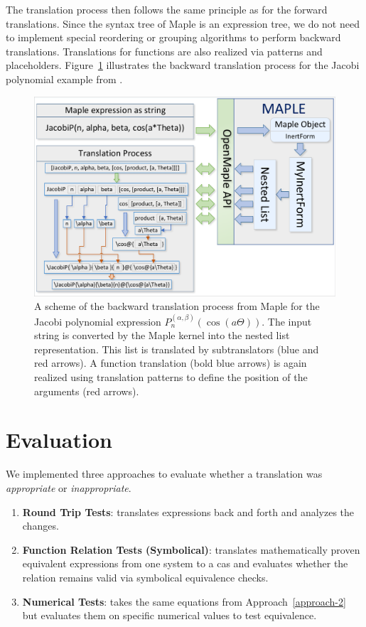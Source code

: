 \documentclass[a4paper,11pt]{article}
\newcommand{\Maple}{Maple}
\theoremstyle{defTheoStyle}
\theoremstyle{defExampStyle}
\begin{document}
The translation process then follows the same principle as for the forward translations. Since the syntax tree of \Maple{} is an expression tree, we do not need to implement special reordering or grouping algorithms to perform backward translations. Translations for functions are also realized via patterns and placeholders. Figure~\ref{fig:backward-trans} illustrates the backward translation process for the Jacobi polynomial example from .

\begin{figure}[t!]
	\centering
	\includegraphics[clip, trim=0.1cm 0.1cm 0.1cm 0.1cm, scale=0.7]{MapleTranslation.pdf}
	\caption{A scheme of the backward translation process from \Maple{} for the Jacobi polynomial expression $P_n^{(\alpha , \beta)}(\cos(a\Theta))$. The input string is converted by the \Maple{} kernel into the nested list representation. This list is translated by subtranslators (blue and red arrows). A function translation (bold blue arrows) is again realized using translation patterns to define the position of the arguments (red arrows).}
	\label{fig:backward-trans}
\end{figure}
 
\section{Evaluation}\label{sec:evaluation}
We implemented three approaches to evaluate whether a translation was \textit{appropriate} or \textit{inappropriate}.
\begin{enumerate}
\item \textbf{Round Trip Tests}: translates expressions back and forth and analyzes the changes.
\item\label{approach-2} \textbf{Function Relation Tests (Symbolical)}: translates mathematically proven equivalent expressions from one system to a \gls*{cas} and evaluates whether the relation remains valid via symbolical equivalence checks.
\item \textbf{Numerical Tests}: takes the same equations from Approach~\ref{approach-2} but evaluates them on specific numerical values to test equivalence.
\end{enumerate}
\end{document}
